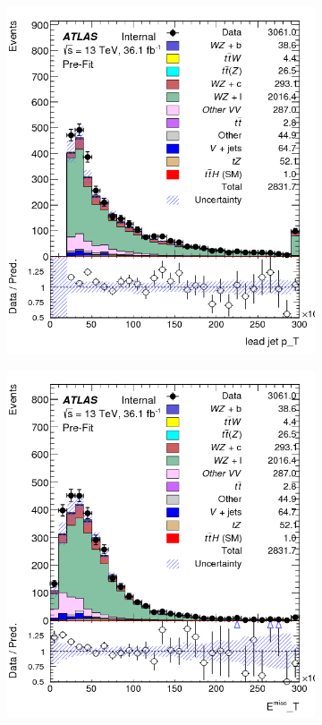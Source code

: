 \documentclass[NOTE, atlasdraft=true, texlive=2016, UKenglish]{\ATLASLATEXPATH atlasdoc}
\begin{document}
\begin{figure}[H]
\begin{subfigure}{.48\textwidth}
        \caption{}
        \label{fig:mll01}
    \end{subfigure}\\
    \begin{subfigure}{.48\textwidth}
        \includegraphics[width=1\linewidth]{lead_jetPt.png}
        \caption{}
        \label{fig:jetPt}
    \end{subfigure}%
    \begin{subfigure}{.48\textwidth}
        \includegraphics[width=1\linewidth]{MET.png}

\end{subfigure}
\end{figure}
\end{document}
